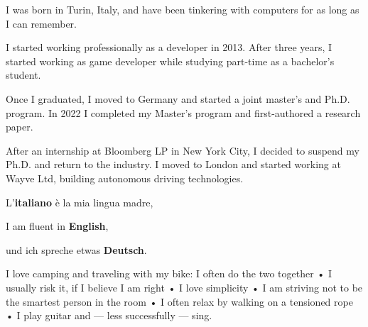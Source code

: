


I was born in Turin, Italy, and have been tinkering with computers for as long as
I can remember. 

I started working professionally as a developer in 2013. After three years, I started working as game developer while studying part-time as a bachelor's student.

Once I graduated, I moved to Germany and started a joint master's and Ph.D. program. In 2022 I completed my Master's program and first-authored a research paper. 

After an internship at Bloomberg LP in New York City, I decided to suspend my Ph.D. and return to the industry. I moved to London and started working at Wayve Ltd, building autonomous driving technologies. 


L'\textbf{italiano} è la mia lingua madre,

I am fluent in \textbf{English},

und ich spreche etwas \textbf{Deutsch}.


I love camping and traveling with my bike: I often do the two together • I usually risk it, if I believe I am right • I love simplicity • I am striving not to be the smartest person in the room • I often relax by walking on a tensioned rope • I play guitar and --- less successfully --- sing.